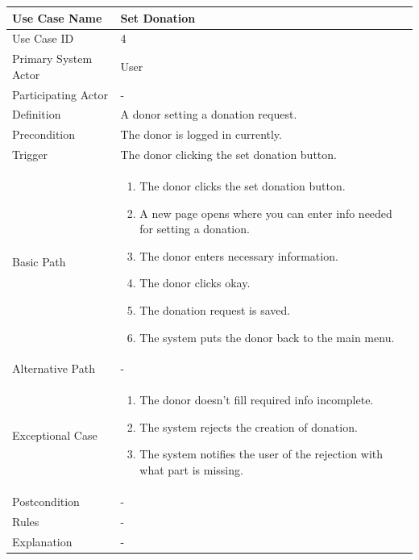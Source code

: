 \documentclass[a4paper,12pt]{report}
\begin{document}
		\begin{tabular}{|m{4cm}|m{11.5cm}|}
			\hline
				Use Case Name & Set Donation\\
			\hline
				Use Case ID & 4\\
			\hline
				Primary System Actor & User\\
			\hline
				Participating Actor & -\\
			\hline
				Definition & A donor setting a donation request.\\
			\hline
				Precondition & The donor is logged in currently.\\
			\hline
				Trigger & The donor clicking the set donation button.\\
			\hline
				Basic Path & \begin{enumerate}
					\item The donor clicks the set donation button.
					\item A new page opens where you can enter info needed for setting a donation.
					\item The donor enters necessary information.
					\item The donor clicks okay.
					\item The donation request is saved.
					\item The system puts the donor back to the main menu.
				\end{enumerate}		
				\\
			\hline
				Alternative Path & -\\
			\hline
				Exceptional Case & \begin{enumerate}
					\item The donor doesn't fill required info incomplete.
					\item The system rejects the creation of donation.
					\item The system notifies the user of the rejection with what part is missing.
				\end{enumerate}
				\\
			\hline
				Postcondition & -\\
			\hline
				Rules & -\\
			\hline
				Explanation & -\\
			\hline
		\end{tabular}
\end{document}

